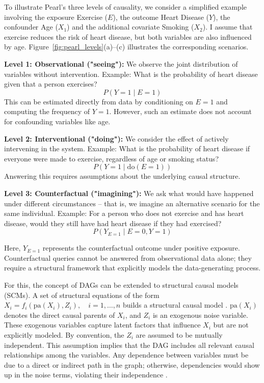 To illustrate Pearl's three levels of causality, we consider a simplified example involving the exposure Exercise ($E$), the outcome Heart Disease ($Y$), the confounder Age ($X_1$) and the additional covariate Smoking ($X_2$). I assume that exercise reduces the risk of heart disease, but both variables are also influenced by age. Figure~\ref{fig:pearl_levels}(a)--(c) illustrates the corresponding scenarios.





\textbf{Level 1: Observational ("seeing"):}  
We observe the joint distribution of variables without intervention.  
Example: What is the probability of heart disease given that a person exercises?  
\[
P(Y = 1 \mid E = 1)
\]
This can be estimated directly from data by conditioning on $E = 1$ and computing the frequency of $Y = 1$. However, such an estimate does not account for confounding variables like age.



\textbf{Level 2: Interventional ("doing"):}  
We consider the effect of actively intervening in the system.  
Example: What is the probability of heart disease if everyone were made to exercise, regardless of age or smoking status?  
\[
P(Y = 1 \mid \text{do}(E = 1))
\]
Answering this requires assumptions about the underlying causal structure.



\textbf{Level 3: Counterfactual ("imagining"):}  
We ask what would have happened under different circumstances -- that is, we imagine an alternative scenario for the same individual.  
Example: For a person who does not exercise and has heart disease, would they still have had heart disease if they had exercised?  
\[
P(Y_{E=1} \mid E = 0, Y = 1)
\]

Here, $Y_{E=1}$ represents the counterfactual outcome under positive exposure. Counterfactual queries cannot be answered from observational data alone; they require a structural framework that explicitly models the data-generating process. 





For this, the concept of DAGs can be extended to structural causal models (SCMs). A set of structural equations of the form $X_i = f_i(\text{pa}(X_i), Z_i), \quad i = 1, \dots, n$ builds a structural causal model \citep{pearl_book2009}.  $\text{pa}(X_i)$ denotes the direct causal parents of $X_i$, and $Z_i$ is an exogenous noise variable. These exogenous variables capture latent factors that influence $X_i$ but are not explicitly modeled. By convention, the $Z_i$ are assumed to be mutually independent. This assumption implies that the DAG includes all relevant causal relationships among the variables. Any dependence between variables must be due to a direct or indirect path in the graph; otherwise, dependencies would show up in the noise terms, violating their independence \citep{pearl_book2009}.

